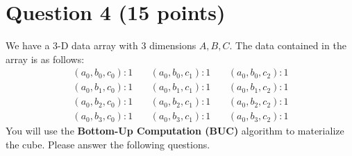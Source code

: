 \section*{Question 4 (15 points)}
We have a 3-D data array with 3 dimensions $A, B, C$. The data contained in the array is as follows:\\
\begin{align*}
(a_0,b_0,c_0): 1 & ~ &  (a_0,b_0,c_1): 1 & ~ &  (a_0,b_0,c_2): 1  \\
(a_0,b_1,c_0): 1 & ~ &  (a_0,b_1,c_1): 1  & ~ &  (a_0,b_1,c_2): 1\\
(a_0,b_2,c_0): 1 & ~ &  (a_0,b_2,c_1): 1 & ~ &  (a_0,b_2,c_2): 1 \\
(a_0,b_3,c_0): 1 & ~ &  (a_0,b_3,c_1): 1 & ~ &  (a_0,b_3,c_2): 1
\end{align*}
You will use the \textbf{Bottom-Up Computation (BUC)} algorithm to materialize the cube. Please answer the following questions.\\
